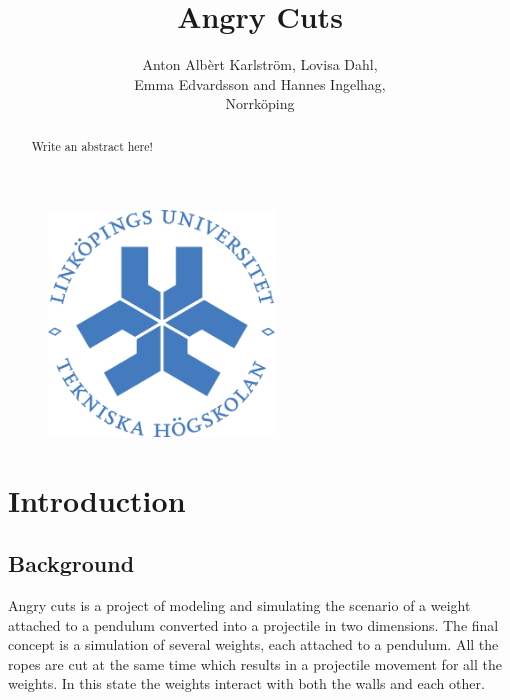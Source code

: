 \documentclass[a4paper,12pt,twoside,english]{article}
\title{Angry Cuts}
\author{Anton Alb\`{e}rt Karlstr\"{o}m, Lovisa Dahl, \\Emma Edvardsson
 and Hannes Ingelhag, \\Norrk\"{o}ping}
\begin{document}


\begin{figure}
\begin{center}
\includegraphics[width=6cm]{bilder/LiTH_sigill_col.png} 
\end{center}
\end{figure}

\maketitle
{}

\newpage
\begin{abstract}
Write an abstract here!
\vfill
\end{abstract}


\newpage

\pagestyle{plain}


\setcounter{page}{1}
\section{Introduction}
\subsection{Background}
Angry cuts is a project of modeling and simulating the scenario of a weight attached to a pendulum converted into a projectile in two dimensions. 
The final concept is a simulation of several weights, each attached to a pendulum. All the ropes are cut at the same time which results in a projectile movement for all the weights. In this state the weights interact with both the walls and each other.
\end{document}
